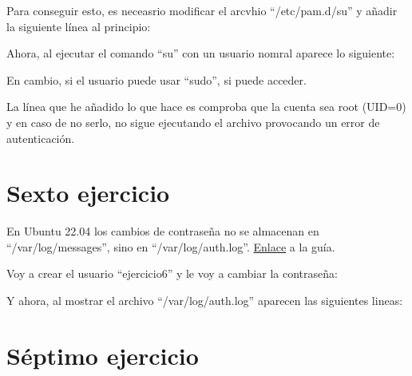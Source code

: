 \documentclass{article}
\begin{document}
Para conseguir esto, es neceasrio modificar el arcvhio ``/etc/pam.d/su'' y añadir la siguiente línea al principio:


Ahora, al ejecutar el comando ``su'' con un usuario nomral aparece lo siguiente:



En cambio, si el usuario puede usar ``sudo'', si puede acceder.


La línea que he añadido lo que hace es comproba que la cuenta sea root (UID=0) y en caso de no serlo, no sigue ejecutando el archivo provocando un error de autenticación.


\section{Sexto ejercicio}
En Ubuntu 22.04 los cambios de contraseña no se almacenan en ``/var/log/messages'', sino en ``/var/log/auth.log''. \href{https://ubuntu.com/tutorials/viewing-and-monitoring-log-files#2-log-files-locations}{Enlace} a la guía.


Voy a crear el usuario ``ejercicio6'' y le voy a cambiar la contraseña:


Y ahora, al mostrar el archivo ``/var/log/auth.log'' aparecen las siguientes lineas:


\section{Séptimo ejercicio}
\end{document}

